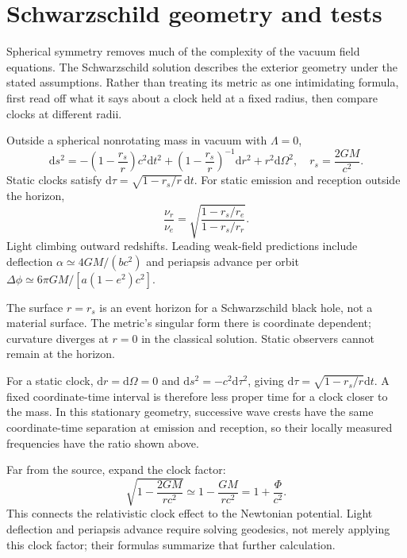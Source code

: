 \documentclass[11pt,oneside]{book}
\newcommand{\dd}{\mathrm{d}}
\theoremstyle{reviewstyle}
\begin{document}
\section{Schwarzschild geometry and tests}
Spherical symmetry removes much of the complexity of the vacuum field equations. The Schwarzschild solution describes the exterior geometry under the stated assumptions. Rather than treating its metric as one intimidating formula, first read off what it says about a clock held at a fixed radius, then compare clocks at different radii.

Outside a spherical nonrotating mass in vacuum with $\Lambda=0$,
\begin{equation}
\dd s^2=-\left(1-\frac{r_s}{r}\right)c^2\dd t^2+
\left(1-\frac{r_s}{r}\right)^{-1}\dd r^2+r^2\dd\Omega^2,\quad r_s=\frac{2GM}{c^2}.
\end{equation}
Static clocks satisfy $\dd\tau=\sqrt{1-r_s/r}\,\dd t$. For static emission and reception outside the horizon,
\begin{equation}\frac{\nu_r}{\nu_e}=\sqrt{\frac{1-r_s/r_e}{1-r_s/r_r}}.\end{equation}
Light climbing outward redshifts. Leading weak-field predictions include deflection $\alpha\simeq4GM/(bc^2)$ and periapsis advance per orbit
$\Delta\phi\simeq6\pi GM/[a(1-e^2)c^2]$.

The surface $r=r_s$ is an event horizon for a Schwarzschild black hole, not a material surface. The metric's singular form there is coordinate dependent; curvature diverges at $r=0$ in the classical solution. Static observers cannot remain at the horizon.

For a static clock, $\dd r=\dd\Omega=0$ and $\dd s^2=-c^2\dd\tau^2$, giving $\dd\tau=\sqrt{1-r_s/r}\dd t$. A fixed coordinate-time interval is therefore less proper time for a clock closer to the mass. In this stationary geometry, successive wave crests have the same coordinate-time separation at emission and reception, so their locally measured frequencies have the ratio shown above.

Far from the source, expand the clock factor:
\begin{equation}
\sqrt{1-\frac{2GM}{rc^2}}\simeq1-\frac{GM}{rc^2}
=1+\frac{\Phi}{c^2}.
\end{equation}
This connects the relativistic clock effect to the Newtonian potential. Light deflection and periapsis advance require solving geodesics, not merely applying this clock factor; their formulas summarize that further calculation.
\end{document}
